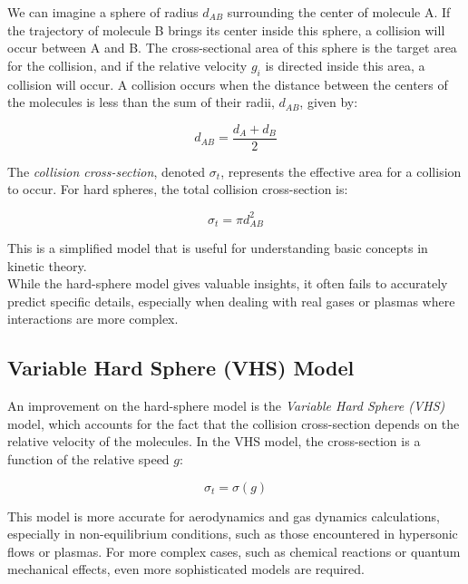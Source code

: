 \documentclass{article}
\begin{document}
We can imagine a sphere of radius \( d_{AB} \) surrounding the center of molecule A. If the trajectory of molecule B brings its center inside this sphere, a collision will occur between A and B. The cross-sectional area of this sphere is the target area for the collision, and if the relative velocity \( g_i \) is directed inside this area, a collision will occur.
A collision occurs when the distance between the centers of the molecules is less than the sum of their radii, \( d_{AB} \), given by:

\[
d_{AB} = \frac{d_A + d_B}{2}
\]

The \emph{collision cross-section}, denoted \( \sigma_t \), represents the effective area for a collision to occur. For hard spheres, the total collision cross-section is:

\[
\sigma_t = \pi d_{AB}^2
\]

This is a simplified model that is useful for understanding basic concepts in kinetic theory.\\


While the hard-sphere model gives valuable insights, it often fails to accurately predict specific details, especially when dealing with real gases or plasmas where interactions are more complex. 

\subsection{Variable Hard Sphere (VHS) Model}

An improvement on the hard-sphere model is the \emph{Variable Hard Sphere (VHS)} model, which accounts for the fact that the collision cross-section depends on the relative velocity of the molecules. In the VHS model, the cross-section is a function of the relative speed \( g \):

\[
\sigma_t = \sigma(g)
\]

This model is more accurate for aerodynamics and gas dynamics calculations, especially in non-equilibrium conditions, such as those encountered in hypersonic flows or plasmas. For more complex cases, such as chemical reactions or quantum mechanical effects, even more sophisticated models are required.

\end{document}
